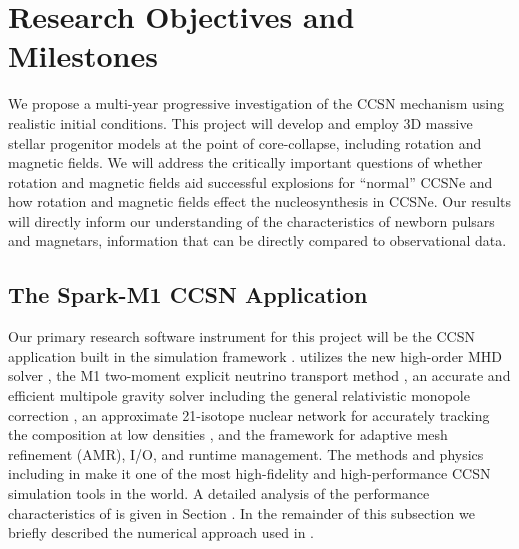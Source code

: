 \section{Research Objectives and Milestones}
\label{sec:objectives}

We propose a multi-year progressive investigation of the CCSN mechanism using realistic initial conditions.
This project will develop and employ 3D massive stellar progenitor models at the point of core-collapse, including rotation and magnetic fields.
We will address the critically important questions of whether rotation and magnetic fields aid successful explosions for ``normal'' CCSNe and how rotation and magnetic fields effect the nucleosynthesis in CCSNe.
Our results will directly inform our understanding of the characteristics of newborn pulsars and magnetars, information that can be directly compared to observational data.

\subsection{The Spark-M1 CCSN Application}

Our primary research software instrument for this project will be the \sparkmone CCSN application built in the \flash simulation framework \citep{Fryxell:2000, Dubey:2009}.
\sparkmone utilizes the new \spark high-order MHD solver \citep{Couch:2017}, the M1 two-moment explicit neutrino transport method \citep{Kuroda:2012, OConnor:2015, OConnor:2015a}, an accurate and efficient multipole gravity solver \citep{Couch:2013c} including the general relativistic monopole correction \citep{Marek:2006}, an approximate 21-isotope nuclear network for accurately tracking the composition at low densities \citep{Couch:2015a}, and the \flash framework for adaptive mesh refinement (AMR), I/O, and runtime management.
The methods and physics including in \sparkmone make it one of the most high-fidelity and high-performance CCSN simulation tools in the world.
A detailed analysis of the performance characteristics of \sparkmone is given in Section .
In the remainder of this subsection we briefly described the numerical approach used in \sparkmone.

